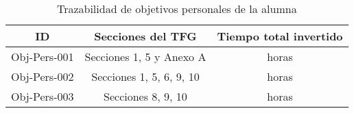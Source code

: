 \begin{table}[H]
    \centering
    \begin{tabular}{|c|c|c|}
    \hline
    \textbf{ID} & \textbf{Secciones del TFG} & \textbf{Tiempo total invertido} \\
    \hline
    Obj-Pers-001 & Secciones 1, 5 y Anexo A & {horas} \\
     \hline
    Obj-Pers-002 & Secciones 1, 5, 6, 9, 10  & {horas} \\
    \hline
    Obj-Pers-003 & Secciones 8, 9, 10 &  {horas} \\
    \hline
    \end{tabular}
\caption{Trazabilidad de objetivos personales de la alumna}
\label{tab:trazabilidadAlum}
\end{table}